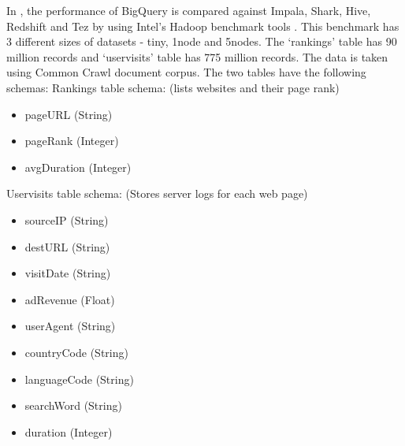 \documentclass[9pt,twocolumn,twoside]{../../styles/osajnl}
\begin{document}
\noindent
In \cite{www-benchmarks-bigguery}, the
performance\cite{www-benchmarks-amplab} of BigQuery is compared
against Impala\cite{www-impala}, Shark\cite{www-apache-spark},
Hive\cite{www-apache-hive}, Redshift\cite{www-amazon-redshift} and
Tez\cite{www-apache-tez} by using Intel's Hadoop
benchmark\cite{www-benchmarks-intel} tools . This benchmark has 3
different sizes of datasets - tiny, 1node and 5nodes. The ‘rankings’
table has 90 million records and ‘uservisits’ table has 775 million
records. The data is taken using Common Crawl\cite{www-commoncrawl}
document corpus. The two tables have the following
schemas:\newline \newline
\noindent
Rankings table schema: (lists websites and their page rank)
\begin{itemize}[noitemsep,topsep=0pt] \item pageURL (String) \item pageRank (Integer) \item avgDuration (Integer) \newline
\end{itemize}
\noindent
Uservisits table schema: (Stores server logs for each web page)
\begin{itemize}[noitemsep,topsep=0pt] \item sourceIP (String) \item destURL (String) \item visitDate (String) \item adRevenue (Float) \item userAgent (String) \item countryCode (String) \item languageCode (String) \item searchWord (String) \item duration (Integer) \newline
\end{itemize}
\end{document}

